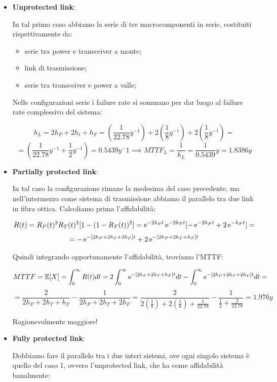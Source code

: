 \begin{itemize}

\item{\textbf{Unprotected link}}:

In tal primo caso abbiamo la serie di tre macrocomponenti in serie, costituiti rispettivamente da:

\begin{itemize}

\item serie tra power e transceiver a monte;
\item link di trasmissione;
\item serie tra transceiver e power a valle;
\end{itemize}

Nelle configurazioni serie i failure rate si sommano per dar luogo al failure rate complessivo del sistema:

\[
	h_L = 2h_P+2h_t+h_F = (\frac{1}{22.78}y^{-1})+2(\frac{1}{8}y^{-1})+2(\frac{1}{8}y^{-1}) =
\]
\[
	= (\frac{1}{22.78}y^{-1} + \frac{1}{2}y^{-1}) = 0.5439y^-1 \implies \underline{MTTF_L} = \frac{1}{h_L} = \frac{1}{0.5439}y = 1.8386y
\]

\item{\textbf{Partially protected link}}:

In tal caso la configurazione rimane la medesima del caso precedente, ma nell'intermezzo come sistema di trasmissione abbiamo il parallelo tra due link in fibra ottica. Calcoliamo prima l'affidabilità:

\[
	R(t) = R_P(t)^2R_T(t)^2[1-(1-R_F(t))^2] = \mathop{}\!\mathrm{e}^{-2h_Pt}\mathop{}\!\mathrm{e}^{-2h_Tt}[-\mathop{}\!\mathrm{e}^{-2h_Ft}+2\mathop{}\!\mathrm{e}^{-h_Ft}] =
\]
\[
	= -\mathop{}\!\mathrm{e}^{-[2h_P+2h_T+2h_F]t}+2\mathop{}\!\mathrm{e}^{-[2h_P+2h_T+h_F]t}
\]

Quindi integrando opportunamente l'affidabilità, troviamo l'MTTF:

\[
	MTTF = \operatorname{\mathbb{E}}[X] = \int_0^\infty{R(t)dt} = 2\int_0^\infty{\mathop{}\!\mathrm{e}^{-[2h_P+2h_T+h_F]t}dt}-\int_0^\infty{\mathop{}\!\mathrm{e}^{-[2h_P+2h_T+2h_F]t}dt} =
\]
\[
	= \frac{2}{2h_P+2h_T+h_F}-\frac{1}{2h_P+2h_T+2h_F} = \frac{2}{2(\frac{1}{8})+2(\frac{1}{8})+\frac{1}{22.78}}-\frac{1}{\frac{1}{2}+\frac{2}{22.78}} = 1.976y
\]

Ragionevolmente maggiore!

\item{\textbf{Fully protected link}}:

Dobbiamo fare il parallelo tra i due interi sistemi, ove ogni singolo sistema è quello del caso 1, ovvero l'unprotected link, che ha come affidabilità banalmente:


\end{itemize}
